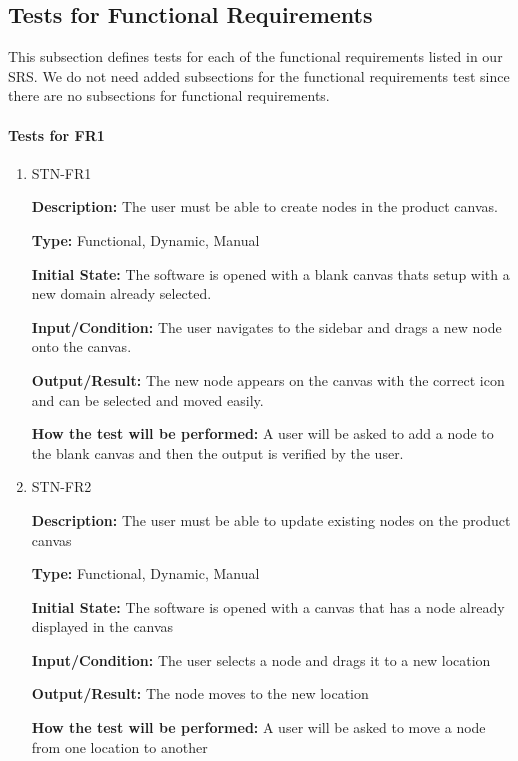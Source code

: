 \documentclass[12pt, titlepage]{article}
\begin{document}
\subsection{Tests for Functional Requirements}
This subsection defines tests for each of the functional requirements listed in our SRS. We do not need added subsections for the functional requirements test since there are no subsections for functional requirements. 
		
\paragraph{Tests for FR1}

\begin{enumerate}

\item{STN-FR1\\}

\textbf{Description:} The user must be able to create nodes in the product canvas.

\textbf{Type:} Functional, Dynamic, Manual

\textbf{Initial State:} The software is opened with a blank canvas thats setup with a new domain already selected.

\textbf{Input/Condition:} The user navigates to the sidebar and drags a new node onto the canvas.

\textbf{Output/Result:} The new node appears on the canvas with the correct icon and can be selected and moved easily.

\textbf{How the test will be performed:} A user will be asked to add a node to the blank canvas and then the output is verified by the user.
					
\item{STN-FR2\\}


\textbf{Description:} The user must be able to update existing nodes on the product canvas

\textbf{Type:} Functional, Dynamic, Manual

\textbf{Initial State:} The software is opened with a canvas that has a node already displayed in the canvas

\textbf{Input/Condition:} The user selects a node and drags it to a new location

\textbf{Output/Result:} The node moves to the new location

\textbf{How the test will be performed:} A user will be asked to move a node from one location to another


\end{enumerate}
\end{document}
